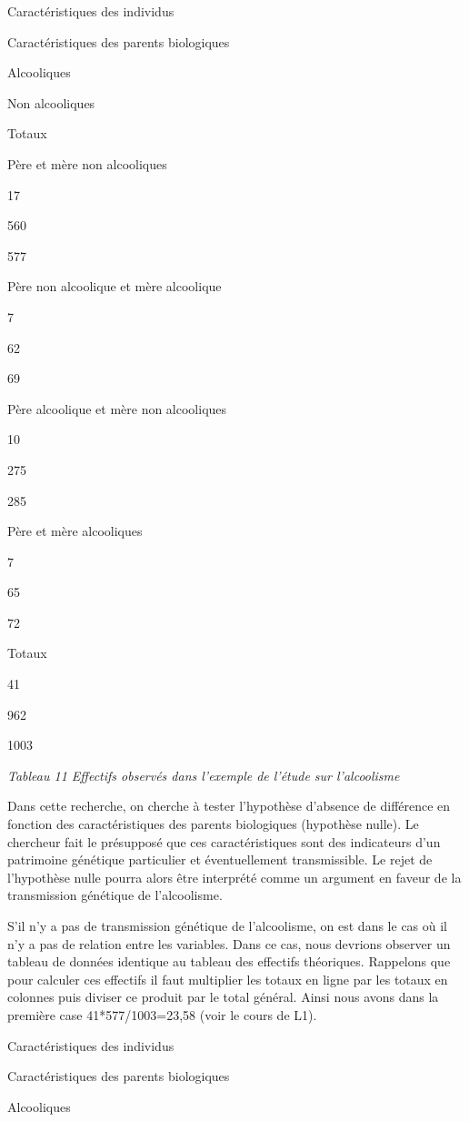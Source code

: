 \documentclass[]{book}
\theoremstyle{definition}
\theoremstyle{definition}
\theoremstyle{definition}
\theoremstyle{remark}
\begin{document}
Caractéristiques des individus

Caractéristiques des parents biologiques

Alcooliques

Non alcooliques

Totaux

Père et mère non alcooliques

17

560

577

Père non alcoolique et mère alcoolique

7

62

69

Père alcoolique et mère non alcooliques

10

275

285

Père et mère alcooliques

7

65

72

Totaux

41

962

1003

\emph{Tableau 11 Effectifs observés dans l'exemple de l'étude sur
l'alcoolisme}

Dans cette recherche, on cherche à tester l'hypothèse d'absence de
différence en fonction des caractéristiques des parents biologiques
(hypothèse nulle). Le chercheur fait le présupposé que ces
caractéristiques sont des indicateurs d'un patrimoine génétique
particulier et éventuellement transmissible. Le rejet de l'hypothèse
nulle pourra alors être interprété comme un argument en faveur de la
transmission génétique de l'alcoolisme.

S'il n'y a pas de transmission génétique de l'alcoolisme, on est dans le
cas où il n'y a pas de relation entre les variables. Dans ce cas, nous
devrions observer un tableau de données identique au tableau des
effectifs théoriques. Rappelons que pour calculer ces effectifs il faut
multiplier les totaux en ligne par les totaux en colonnes puis diviser
ce produit par le total général. Ainsi nous avons dans la première case
41*577/1003=23,58 (voir le cours de L1).

Caractéristiques des individus

Caractéristiques des parents biologiques

Alcooliques
\end{document}
